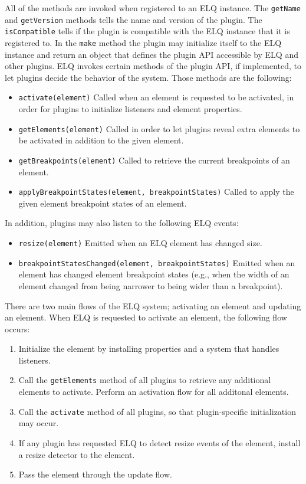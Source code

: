 \documentclass{llncs}
\newcommand{\code}[1]{\texttt{#1}}
\newcommand{\elq}{ELQ}
\begin{document}
  \noindent
  All of the methods are invoked when registered to an \elq{} instance.
  The \code{getName} and \code{getVersion} methods tells the name and version of the plugin.
  The \code{isCompatible} tells if the plugin is compatible with the \elq{} instance that it is registered to.
  In the \code{make} method the plugin may initialize itself to the \elq{} instance and return an object that defines the plugin API accessible by \elq{} and other plugins.
  \elq{} invokes certain methods of the plugin API, if implemented, to let plugins decide the behavior of the system.
  Those methods are the following:
  \begin{itemize}
    \item \code{activate(element)}
          Called when an element is requested to be activated, in order for plugins to initialize listeners and element properties.
    \item \code{getElements(element)}
          Called in order to let plugins reveal extra elements to be activated in addition to the given element.
    \item \code{getBreakpoints(element)}
          Called to retrieve the current breakpoints of an element.
    \item \code{applyBreakpointStates(element, breakpointStates)}
          Called to apply the given element breakpoint states of an element.
  \end{itemize}

  \noindent
  In addition, plugins may also listen to the following \elq{} events:
  \begin{itemize}
    \item \code{resize(element)}
          Emitted when an \elq{} element has changed size.
    \item \code{breakpointStatesChanged(element, breakpointStates)}
          Emitted when an element has changed element breakpoint states (e.g., when the width of an element changed from being narrower to being wider than a breakpoint).
  \end{itemize}

  \noindent
  There are two main flows of the \elq{} system; activating an element and updating an element.
  When \elq{} is requested to activate an element, the following flow occurs:

  \begin{enumerate}
    \item Initialize the element by installing properties and a system that handles listeners.
    \item
          Call the \code{getElements} method of all plugins to retrieve any additional elements to activate.
          Perform an activation flow for all additonal elements.
    \item Call the \code{activate} method of all plugins, so that plugin-specific initialization may occur.
    \item If any plugin has requested \elq{} to detect resize events of the element, install a resize detector to the element.
    \item Pass the element through the update flow.
  \end{enumerate}
\end{document}
